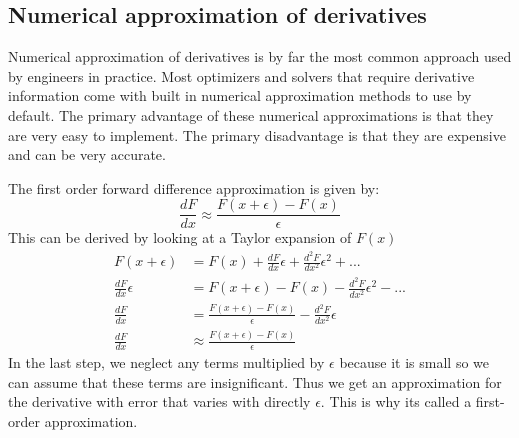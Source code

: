 \documentclass[conf]{new-aiaa}
\begin{document}

    \subsection{Numerical approximation of derivatives}
    Numerical approximation of derivatives is by far the most common approach used by engineers in practice. 
    Most optimizers and solvers that require derivative information come with built in numerical approximation methods to use by default. 
    The primary advantage of these numerical approximations is that they are very easy to implement.
    The primary disadvantage is that they are expensive and can be very accurate. 

    The first order forward difference approximation is given by: 
    \begin{equation}
        \frac{dF}{dx} \approx \frac{F(x+\epsilon) - F(x)}{\epsilon}
    \end{equation}
    This can be derived by looking at a Taylor expansion of $F(x)$
    \begin{align}
        F(x+\epsilon) &= F(x) + \frac{dF}{dx}\epsilon + \frac{d^2F}{dx^2}\epsilon^2 + ... \\
        \frac{dF}{dx}\epsilon &= F(x+\epsilon) - F(x) - \frac{d^2F}{dx^2}\epsilon^2 - ... \\
        \frac{dF}{dx} &= \frac{F(x+\epsilon) - F(x)}{\epsilon} - \frac{d^2F}{dx^2}\epsilon \\
        \frac{dF}{dx} &\approx \frac{F(x+\epsilon) - F(x)}{\epsilon}
    \end{align}
    In the last step, we neglect any terms multiplied by $\epsilon$ because it is small so we can assume that these terms are insignificant. 
    Thus we get an approximation for the derivative with error that varies with directly $\epsilon$. 
    This is why its called a first-order approximation. 
\end{document}
